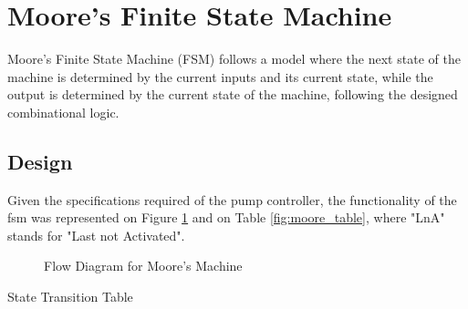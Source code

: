 \section{Moore's Finite State Machine}

Moore's Finite State Machine (FSM) follows a model where the next state of the machine is determined by the current
inputs and its current state, while the output is determined by the current state of the machine, following the
designed combinational logic.

\subsection{Design}

Given the specifications required of the pump controller, the functionality of the fsm was represented
on Figure \ref{fig:moore_flow} and on Table \ref{fig:moore_table}, where "LnA" stands for "Last not Activated".

\begin{figure}[h]
    \begin{center}
        
        \caption{Flow Diagram for Moore's Machine}
        \label{fig:moore_flow}
    \end{center}
\end{figure}

\begin{table}[ht]
    \begin{center}
        
        \caption{State Transition Table}
        \label{fig:moore_table}
    \end{center}
\end{table}

